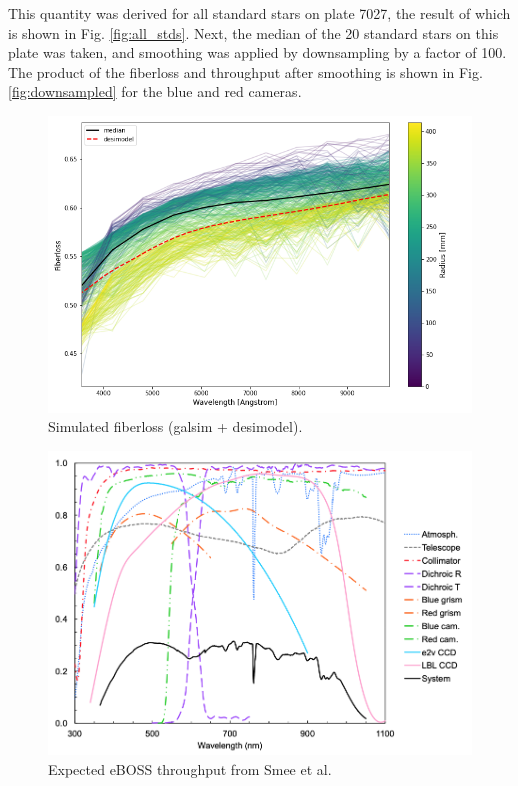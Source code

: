 This quantity was derived for all standard stars on plate 7027, the result of which is shown in Fig. \ref{fig:all_stds}. Next, the median of the 20 standard stars on this plate was taken, and smoothing was applied by downsampling by a factor of 100. The product of the fiberloss and throughput after smoothing is shown in Fig. \ref{fig:downsampled} for the blue and red cameras.

\begin{figure}[h]
\centering
\includegraphics[width=14cm]{images/specsim/desimodel-qso-fiberloss.png}
\caption{Simulated fiberloss (galsim + desimodel).}
\label{fig:desimodel_qso_floss}
\end{figure}

\begin{figure}[h]
\centering
\includegraphics[width=14cm]{images/specsim/smee_throughput.png}
\caption{Expected eBOSS throughput from Smee et al.}
\label{fig:smee}
\end{figure}

